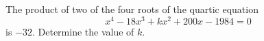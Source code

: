 The product of two of the four roots of the quartic equation
\[x^4-18x^3+kx^2+200x-1984=0\]
is $-32$. Determine the value of $k$.
